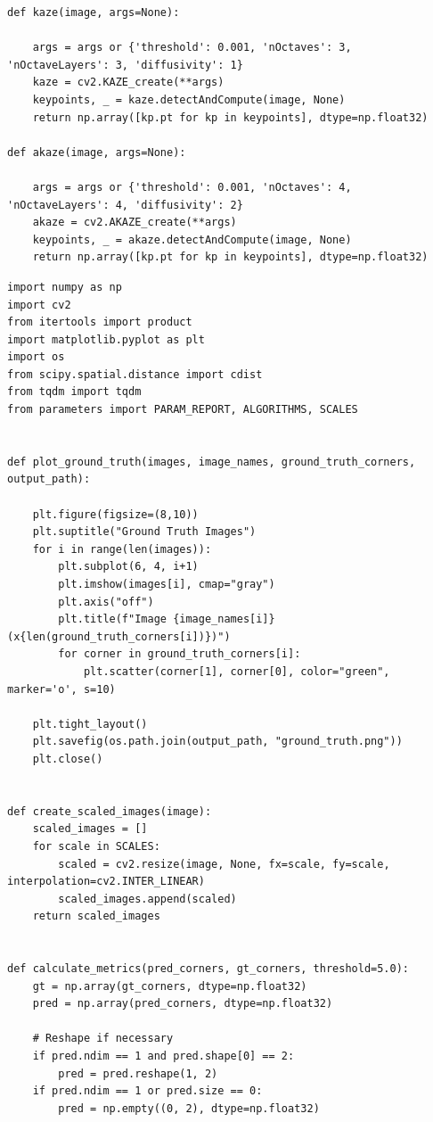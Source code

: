 \documentclass[journal]{IEEEtran}
\begin{document}
\begin{lstlisting}[style=python, caption={All Corner Detection Wrappers}, label={lst:corner_methods}]
def kaze(image, args=None):

    args = args or {'threshold': 0.001, 'nOctaves': 3, 'nOctaveLayers': 3, 'diffusivity': 1}
    kaze = cv2.KAZE_create(**args)
    keypoints, _ = kaze.detectAndCompute(image, None)
    return np.array([kp.pt for kp in keypoints], dtype=np.float32)

def akaze(image, args=None):

    args = args or {'threshold': 0.001, 'nOctaves': 4, 'nOctaveLayers': 4, 'diffusivity': 2}
    akaze = cv2.AKAZE_create(**args)
    keypoints, _ = akaze.detectAndCompute(image, None)
    return np.array([kp.pt for kp in keypoints], dtype=np.float32)
\end{lstlisting}
\bigskip
\bigskip

\begin{lstlisting}[style=python, caption={Utility Functions for Data Processing}, label={lst:utilities}]
import numpy as np
import cv2
from itertools import product
import matplotlib.pyplot as plt
import os
from scipy.spatial.distance import cdist
from tqdm import tqdm
from parameters import PARAM_REPORT, ALGORITHMS, SCALES


def plot_ground_truth(images, image_names, ground_truth_corners, output_path):
    
    plt.figure(figsize=(8,10))
    plt.suptitle("Ground Truth Images")
    for i in range(len(images)):
        plt.subplot(6, 4, i+1)
        plt.imshow(images[i], cmap="gray")
        plt.axis("off")
        plt.title(f"Image {image_names[i]} (x{len(ground_truth_corners[i])})")
        for corner in ground_truth_corners[i]:
            plt.scatter(corner[1], corner[0], color="green", marker='o', s=10)
            
    plt.tight_layout()
    plt.savefig(os.path.join(output_path, "ground_truth.png"))
    plt.close()


def create_scaled_images(image):
    scaled_images = []
    for scale in SCALES:
        scaled = cv2.resize(image, None, fx=scale, fy=scale, interpolation=cv2.INTER_LINEAR)
        scaled_images.append(scaled)
    return scaled_images


def calculate_metrics(pred_corners, gt_corners, threshold=5.0):
    gt = np.array(gt_corners, dtype=np.float32)
    pred = np.array(pred_corners, dtype=np.float32)

    # Reshape if necessary
    if pred.ndim == 1 and pred.shape[0] == 2:
        pred = pred.reshape(1, 2)
    if pred.ndim == 1 or pred.size == 0:
        pred = np.empty((0, 2), dtype=np.float32)


\end{lstlisting}
\end{document}
